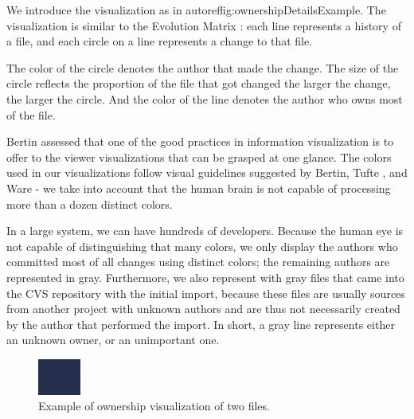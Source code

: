 \documentclass[10pt]{book}
\begin{document}
We introduce the \omap visualization as in autoref{fig:ownershipDetailsExample}. The visualization is similar to the Evolution Matrix \cite{Lanz02a}: each line represents a history of a file, and each circle on a line represents a change to that file.

The color of the circle denotes the author that made the change. The size of the circle reflects the proportion of the file that got changed \ie the larger the change, the larger the circle. And the color of the line denotes the author who owns most of the file.

Bertin \cite{Bert74a} assessed that one of the good practices in information visualization is to offer to the viewer visualizations that can be grasped at one glance. The colors used in our visualizations follow visual guidelines suggested by Bertin, Tufte \cite{Tuft90a}, and Ware \cite{Ware00a} \-- \eg we take into account that the human brain is not capable of processing more than a dozen distinct colors.

In a large system, we can have hundreds of developers. Because the human eye is not capable of distinguishing that many colors, we only display the authors who committed most of all changes using distinct colors; the remaining authors are represented in gray. Furthermore, we also represent with gray files that came into the CVS repository with the initial import, because these files are usually sources from another project with unknown authors and are thus not necessarily created by the author that performed the import. In short, a gray line represents either an unknown owner, or an unimportant one.

\begin{figure}[htb]
\begin{center}
\includegraphics[width=\linewidth]{owners-map-detail}
\caption{Example of ownership visualization of two files.}
\label{fig:ownershipDetailsExample}
\end{center}
\end{figure}
\end{document}
